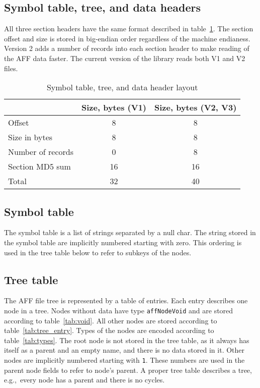 \documentclass[10pt,letterpaper]{article}
\newcommand{\bc}{\begin{center}}
\newcommand{\ec}{\end{center}}
\newcommand{\ctext}[1]{\texttt{#1}}         %
\begin{document}
\subsection{Symbol table, tree, and data headers}
All three section headers have the same format described in
table~\ref{tab:shdr}. The section offset and size is stored in
big-endian order regardless of the machine endianess.  Version 2 adds
a number of records into each section header to make reading of the
AFF data faster. The current version of the library reads both V1 and
V2 files.
\begin{table}[h]
\bc
\caption{Symbol table, tree, and data header layout}\label{tab:shdr}
\begin{tabular}{|l|c|c|} \hline
 & Size, bytes (V1) & Size, bytes (V2, V3) \\ \hline\hline
Offset  & 8 & 8\\ \hline
Size in bytes & 8 & 8\\ \hline
Number of records & 0 & 8\\ \hline
Section MD5 sum & 16 & 16 \\ \hline\hline
Total & 32 & 40 \\ \hline
\end{tabular}
\ec
\end{table}

\subsection{Symbol table}
The symbol table is a list of strings separated by a null char. The
string stored in the symbol table are implicitly numbered starting
with zero. This ordering is used in the tree table below to refer to
subkeys of the nodes.

\subsection{Tree table}
The AFF file tree is represented by a table of entries. Each entry
describes one node in a tree. Nodes without data have type
\ctext{affNodeVoid} and are stored according to
table~\ref{tab:void}. All other nodes are stored according to
table~\ref{tab:tree_entry}. Types of the nodes are encoded according to
table~\ref{tab:types}. The root node is not stored in the tree table,
as it always has itself as a parent and an empty name, and there is no
data stored in it. Other nodes are implicitly numbered starting with
\ctext{1}. These numbers are used in the parent node fields to refer
to node's parent. A proper tree table describes a tree, e.g.,~every
node has a parent and there is no cycles.
\end{document}
